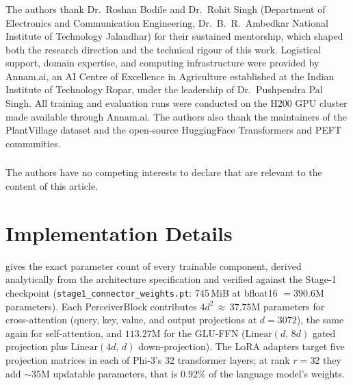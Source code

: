 \documentclass[runningheads]{llncs}
\begin{document}
\begin{credits}
\subsubsection{\ackname}
The authors thank Dr.\ Roshan Bodile and Dr.\ Rohit Singh (Department of
Electronics and Communication Engineering, Dr.\ B.\ R.\ Ambedkar National
Institute of Technology Jalandhar) for their sustained mentorship, which
shaped both the research direction and the technical rigour of this work.
Logistical support, domain expertise, and computing infrastructure were
provided by Annam.ai, an AI Centre of Excellence in Agriculture established
at the Indian Institute of Technology Ropar, under the leadership of
Dr.\ Pushpendra Pal Singh. All training and evaluation runs were conducted
on the H200 GPU cluster made available through Annam.ai. The authors also
thank the maintainers of the PlantVillage dataset and the open-source
HuggingFace Transformers and PEFT communities.

\subsubsection{\discintname}
The authors have no competing interests to declare that are relevant to the
content of this article.
\end{credits}

\appendix

\section{Implementation Details}
\label{app:params}

 gives the exact parameter count of every trainable
component, derived analytically from the architecture specification and
verified against the Stage-1 checkpoint
(\texttt{stage1\_connector\_weights.pt}: 745\,MiB at bfloat16
$=390.6$M parameters).
Each PerceiverBlock contributes $4d^2\,{\approx}\,37.75$M parameters for
cross-attention (query, key, value, and output projections at $d{=}3072$),
the same again for self-attention, and $113.27$M for the GLU-FFN
($\mathrm{Linear}(d,\,8d)$ gated projection plus $\mathrm{Linear}(4d,\,d)$
down-projection).
The LoRA adapters target five projection matrices in each of Phi-3's 32
transformer layers; at rank $r{=}32$ they add ${\sim}35$M updatable
parameters, that is $0.92\%$ of the language model's weights.
\end{document}
